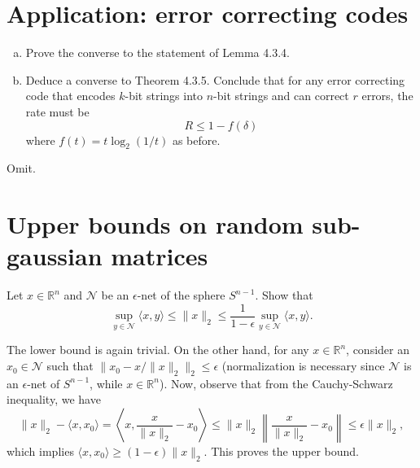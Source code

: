 \section{Application: error correcting codes}
\begin{problem*}[Exercise 4.3.7]\label{ex4.3.7}
	\begin{enumerate}[(a)]
		\item\label{ex4.3.7:a} Prove the converse to the statement of Lemma 4.3.4.
		\item\label{ex4.3.7:b} Deduce a converse to Theorem 4.3.5. Conclude that for any error correcting code that encodes \(k\)-bit strings into \(n\)-bit strings and can correct \(r\) errors, the rate must be
		      \[
			      R \leq 1 - f(\delta )
		      \]
		      where \(f(t) = t \log _2 (1 / t)\) as before.
	\end{enumerate}
\end{problem*}
\begin{answer}
	Omit.
\end{answer}

\section{Upper bounds on random sub-gaussian matrices}
\begin{problem*}[Exercise 4.4.2]\label{ex4.4.2}
	Let \(x \in \mathbb{R} ^n\) and \(\mathcal{N} \) be an \(\epsilon \)-net of the sphere \(S^{n-1}\). Show that
	\[
		\sup _{y \in \mathcal{N} }\langle x, y \rangle
		\leq \lVert x \rVert _2
		\leq \frac{1}{1 - \epsilon } \sup _{y \in \mathcal{N} }\langle x, y \rangle .
	\]
\end{problem*}
\begin{answer}
	The lower bound is again trivial. On the other hand, for any \(x \in \mathbb{R} ^n\), consider an \(x_0 \in \mathcal{N} \) such that \(\lVert x_0 - x / \lVert x \rVert _2 \rVert _2 \leq \epsilon \) (normalization is necessary since \(\mathcal{N} \) is an \(\epsilon \)-net of \(S^{n-1}\), while \(x \in \mathbb{R} ^n\)). Now, observe that from the Cauchy-Schwarz inequality, we have
	\[
		\lVert x \rVert _2 - \langle x, x_0 \rangle
		= \left\langle x, \frac{x}{\lVert x \rVert _2} - x_0 \right\rangle
		\leq \lVert x \rVert _2 \left\lVert \frac{x}{\lVert x \rVert _2} - x_0 \right\rVert
		\leq \epsilon \lVert x \rVert _2,
	\]
	which implies \(\langle x, x_0 \rangle \geq (1 - \epsilon ) \lVert x \rVert _2\). This proves the upper bound.
\end{answer}

